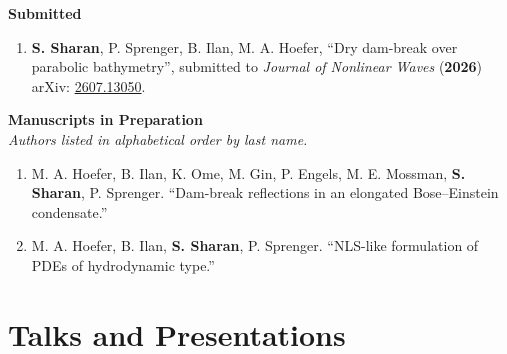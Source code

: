 \documentclass[letterpaper,10pt]{article} %
\begin{document}
\vspace{6pt}
\textbf{\color{subhead}Submitted}\\[2pt]
\vspace{2pt}
\begin{enumerate}[itemsep=6pt, topsep=3pt, parsep=0pt, partopsep=0pt]

    \item \textbf{\color{headcol}S. Sharan}, P. Sprenger, B. Ilan, M. A. Hoefer, ``Dry dam-break over parabolic bathymetry'', submitted to \textit{Journal of Nonlinear Waves} (\textbf{2026})\\ {\small arXiv:} \href{https://arxiv.org/abs/2607.13050}{\small \color{headcol}2607.13050}.
\end{enumerate}

\vspace{6pt}
\textbf{\color{subhead}Manuscripts in Preparation}\\[2pt]
{\small \textit{Authors listed in alphabetical order by last name.}}
\vspace{2pt}
\begin{enumerate}[itemsep=6pt, topsep=3pt, parsep=0pt, partopsep=0pt]

    \item M. A. Hoefer, B. Ilan, K. Ome, M. Gin, P. Engels, M. E. Mossman, \textbf{\color{headcol}S. Sharan}, P. Sprenger. ``Dam-break reflections in an elongated Bose--Einstein condensate.''
    
    \item M. A. Hoefer, B. Ilan, \textbf{\color{headcol}S. Sharan}, P. Sprenger. ``NLS-like formulation of PDEs of hydrodynamic type.''
\end{enumerate}

\section{\color{headcol}Talks and Presentations}
\vspace{-1.2pt} %
\end{document}
